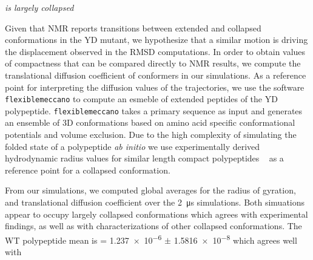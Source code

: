 {\it \gct{} is largely collapsed}

Given that NMR reports transitions between extended and collapsed conformations in the YD mutant, we hypothesize that a similar motion is driving the displacement observed in the RMSD computations. In order to obtain values of compactness that can be compared directly to NMR results, we compute the translational diffusion coefficient of conformers in our simulations. As a reference point for interpreting the diffusion values of the trajectories, we use the software \texttt{flexiblemeccano} to compute an esmeble of extended peptides of the YD polypeptide. \texttt{flexiblemeccano} takes a primary sequence as input and generates an ensemble of 3D conformations based on amino acid specific conformational potentials and volume exclusion.  Due to the high complexity of simulating the folded state of a polypeptide {\it ab initio} we use experimentally derived hydrodynamic radius values for similar length compact polypeptides ~\cite{wilkins1999hydrodynamic} as a reference point for a collapsed conformation.

From our simulations, we computed global averages for the radius of gyration, and translational diffusion coefficient over the \SI{2}{\us} simulations. Both simuations appear to occupy largely collapsed conformations which agrees with experimental findings, as well as with characterizations of other collapsed conformations. The WT polypeptide \diffusion mean is \diffusion = \num{1.237e-6} $\pm$ \SI{1.5816e-8}{\dcunits} which agrees well with  





